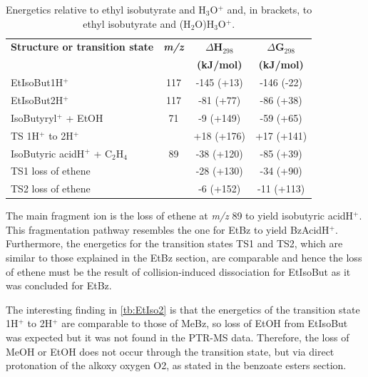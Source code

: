 \begin{table}[htbp]
\centering
\caption{Energetics relative to ethyl isobutyrate and H$_3$O$^+$ and, in brackets, to ethyl isobutyrate and (H$_2$O)H$_3$O$^+$.}
\label{tb:EtIso2}
\begin{tabular}{lccc}
\toprule
\textbf{Structure or transition state}	&\textbf{\textit{m/z} } &\textbf{$\Delta$H$_{298}$} &\textbf{$\Delta$G$_{298}$}\\
& &	\textbf{(kJ/mol)} &\textbf{(kJ/mol)} \\  \toprule
EtIsoBut1H$^+$ & 117 & -145 (+13) & -146 (-22) \\ \midrule
EtIsoBut2H$^+$ & 117 & -81 (+77) & -86 (+38) \\ \midrule
IsoButyryl$^+$ + EtOH & 71 & -9 (+149) & -59 (+65) \\ \midrule
TS 1H$^+$ to 2H$^+$ &  & +18 (+176) & +17 (+141) \\ \midrule
IsoButyric acidH$^+$ + C$_2$H$_4$ & 89 & -38 (+120) & -85 (+39) \\ \midrule
TS1 loss of ethene  &  & -28 (+130) & -34 (+90) \\ \midrule
TS2 loss of ethene  &  & -6 (+152) & -11 (+113) \\
\bottomrule
\end{tabular}
\end{table}




The main fragment ion is the loss of ethene at \textit{m/z} 89 to yield isobutyric acidH$^+$.
%
This fragmentation pathway resembles the one for EtBz to yield BzAcidH$^+$.
%
Furthermore, the energetics for the transition states TS1 and TS2, which are similar to those explained in the EtBz section, are comparable and hence the loss of ethene must be the result of collision-induced dissociation for EtIsoBut as it was concluded for EtBz.
%


The interesting finding in \autoref{tb:EtIso2} is that the energetics of the transition state 1H$^+$ to 2H$^+$ are comparable to those of MeBz, so loss of EtOH from EtIsoBut was expected but it was not found in the PTR-MS data.
%
Therefore, the loss of MeOH or EtOH does not occur through the transition state, but via direct protonation of the alkoxy oxygen O2, as stated in the benzoate esters section.











